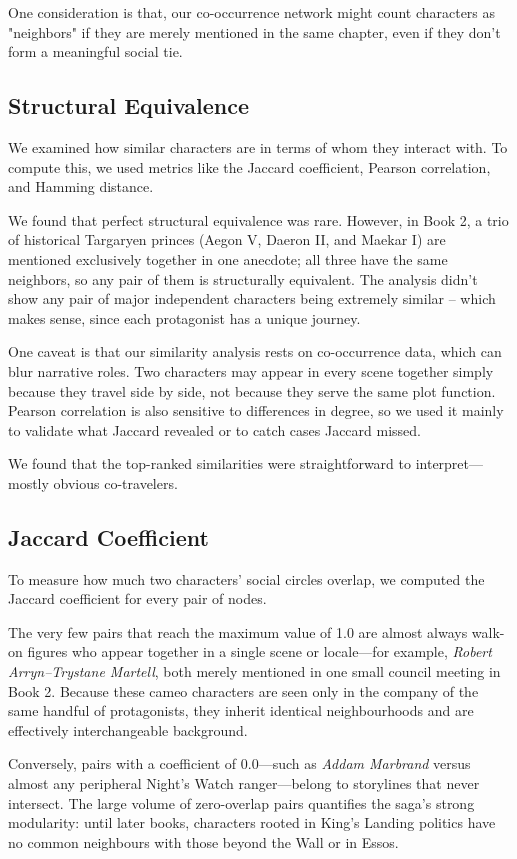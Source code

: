 \documentclass[12pt, a4paper]{article}
\begin{document}
One  consideration is that, our co-occurrence network might count characters as "neighbors" if they are merely mentioned in the same chapter, even if they don't form a meaningful social tie.

\subsection*{Structural Equivalence} 
We examined how similar characters are in terms of whom they interact with. To compute this, we used metrics like the Jaccard coefficient, Pearson correlation, and Hamming distance. 

We found that perfect structural equivalence was rare. However, in Book 2, a trio of historical Targaryen princes (Aegon V, Daeron II, and Maekar I) are mentioned exclusively together in one anecdote; all three have the same neighbors, so any pair of them is structurally equivalent. 
The analysis didn't show any pair of major independent characters being extremely similar – which makes sense, since each protagonist has a unique journey. 

One caveat is that our similarity analysis rests on co-occurrence data, which can blur narrative roles. Two characters may appear in every scene together simply because they travel side by side, not because they serve the same plot function. Pearson correlation is also sensitive to differences in degree, so we used it mainly to validate what Jaccard revealed or to catch cases Jaccard missed.

We found that the top-ranked similarities were straightforward to interpret—mostly obvious co-travelers.

\subsection*{Jaccard Coefficient}

To measure how much two characters’ social circles overlap, we computed the
Jaccard coefficient for every pair of nodes.

The very few pairs that reach the maximum value of 1.0 are almost always
walk-on figures who appear together in a single scene or locale—for example,
\textit{Robert Arryn–Trystane Martell}, both merely mentioned in one small
council meeting in Book 2.  Because these cameo characters are seen only in the
company of the same handful of protagonists, they inherit identical
neighbourhoods and are effectively interchangeable background.

Conversely, pairs with a coefficient of 0.0—such as \textit{Addam Marbrand}
versus almost any peripheral Night’s Watch ranger—belong to storylines that
never intersect.  The large volume of zero-overlap pairs quantifies the
saga’s strong modularity: until later books, characters rooted in King’s
Landing politics have no common neighbours with those beyond the Wall or in
Essos.
\end{document}
